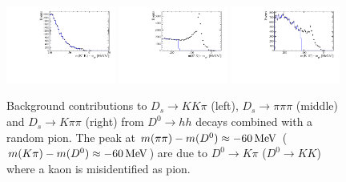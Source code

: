 \begin{figure}[h]
\centering
\includegraphics[height=!,width=0.32\textwidth]{figs/BkgStudies/norm_Ds2KKpi_as_D02KK_compareVeto.pdf} 
\includegraphics[height=!,width=0.32\textwidth]{figs/BkgStudies/norm_Ds2pipipi_as_D02pipi_compareVeto.pdf} 
\includegraphics[height=!,width=0.32\textwidth]{figs/BkgStudies/norm_Ds2Kpipi_as_D02Kpi_compareVeto.pdf} 
\caption{
Background contributions to $D_s \to KK\pi$ (left), $D_s \to \pi\pi\pi$ (middle) and $D_s \to K\pi\pi$ (right) from $D^0\to hh$ decays combined with a random pion.
The peak at $m(\pi\pi) - m(D^0) \approx -60 \mathrm{\,Me\kern -0.1em V}$ ($m(K\pi) - m(D^0) \approx -60 \mathrm{\,Me\kern -0.1em V}$) are due to $D^0\to K\pi$ ($D^0\to KK$) where a kaon is misidentified as pion.
}
\label{fig:vetoD0}
\end{figure}
